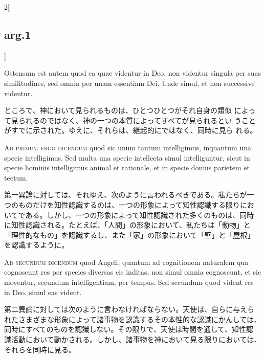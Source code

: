 \documentclass[paper=a4paper,fontsize=10pt,jafontsize=9pt,titlepage]{jlreq}
\begin{document}
\begin{paracol}{2}[\subsection{arg.1}]
\switchcolumn*

Ostensum est autem quod ea quae videntur in Deo, non
videntur singula per suas similitudines, sed omnia per unam essentiam
Dei. Unde simul, et non successive videntur.

\switchcolumn

ところで、神において見られるものは、ひとつひとつがそれ自身の類似
によって見られるのではなく、神の一つの本質によってすべてが見られるとい
うことがすでに示された。ゆえに、それらは、継起的にではなく、同時に見ら
れる。

\switchcolumn*[\subsection{ad.1}]

{\scshape Ad primum ergo dicendum} quod sic unum tantum intelligimus,
inquantum una specie intelligimus. Sed multa una specie intellecta
simul intelliguntur, sicut in specie hominis intelligimus animal et
rationale, et in specie domus parietem et tectum.

\switchcolumn

第一異論に対しては、それゆえ、次のように言われるべきである。私たちが一
つのものだけを知性認識するのは、一つの形象によって知性認識する限りにお
いてである。しかし、一つの形象によって知性認識された多くのものは、同時
に知性認識される。たとえば、「人間」の形象において、私たちは「動物」と
「理性的なもの」を認識するし、また「家」の形象において「壁」と「屋根」
を認識するように。

\switchcolumn*[\subsection{ad.2}]

{\scshape Ad secundum dicendum} quod Angeli, quantum ad cognitionem
naturalem qua cognoscunt res per species diversas eis inditas, non
simul omnia cognoscunt, et sic moventur, secundum intelligentiam, per
tempus. Sed secundum quod vident res in Deo, simul eas vident.

\switchcolumn

第二異論に対しては次のように言わなければならない。天使は、自らに与えら
れたさまざまな形象によって諸事物を認識するその本性的な認識にかんしては、
同時にすべてのものを認識しない。その限りで、天使は時間を通して、知性認
識活動において動かされる。しかし、諸事物を神において見る限りにおいては、
それらを同時に見る。

\end{paracol}
\end{document}
